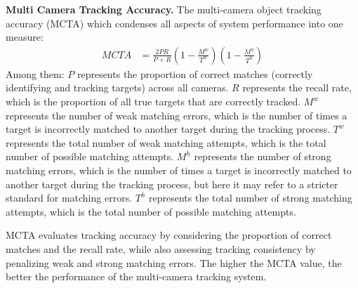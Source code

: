 \documentclass[lettersize,journal]{IEEEtran}
\begin{document}
\textbf{Multi Camera Tracking Accuracy.}
The multi-camera object tracking accuracy (MCTA) which condenses all aspects of system performance into one measure\cite{Alpher23b}:
\begin{align}
	\mathit{MCTA} & = \frac{2 P R}{P+R}\left(1-\frac{M^{w}}{T^{w}}\right)\left(1-\frac{M^{h}}{T^{h}}\right)
\end{align}
Among them:
$P$ represents the proportion of correct matches (correctly identifying and tracking targets) across all cameras.  
$R$ represents the recall rate, which is the proportion of all true targets that are correctly tracked.  
$M^{w}$ represents the number of weak matching errors, which is the number of times a target is incorrectly matched to another target during the tracking process.  
$T^{w}$ represents the total number of weak matching attempts, which is the total number of possible matching attempts.  
$M^{h}$ represents the number of strong matching errors, which is the number of times a target is incorrectly matched to another target during the tracking process, but here it may refer to a stricter standard for matching errors.  
$T^{h}$ represents the total number of strong matching attempts, which is the total number of possible matching attempts.

MCTA evaluates tracking accuracy by considering the proportion of correct matches and the recall rate, while also assessing tracking consistency by penalizing weak and strong matching errors. 
The higher the MCTA value, the better the performance of the multi-camera tracking system.
\end{document}
